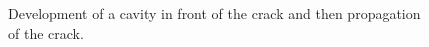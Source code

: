 \begin{figure}
\begin{minipage}[b]{0.19\linewidth}
\end{minipage}
\begin{minipage}[b]{0.19\linewidth}
\end{minipage}
\caption{Development of a cavity in front of the crack and then propagation of the crack.}
\label{fig:cavity_crack}
\end{figure}


